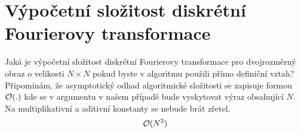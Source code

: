 \section{Výpočetní složitost diskrétní Fourierovy transformace}
Jaká je výpočetní složitost diskrétní Fourierovy transformace pro dvojrozměrný obraz o velikosti 
$N \times N$ pokud byste v algoritmu použili přímo definiční vztah? Připomínám, že asymptotický 
odhad algoritmické složitosti se zapisuje formou $\mathcal{O}(.)$ kde se v argumentu v našem případě bude 
vyskytovat výraz obsahující $N$. Na multiplikativní a aditivní konstanty se nebude brát zřetel.
\[
    \mathcal{O}(N^2)
\]